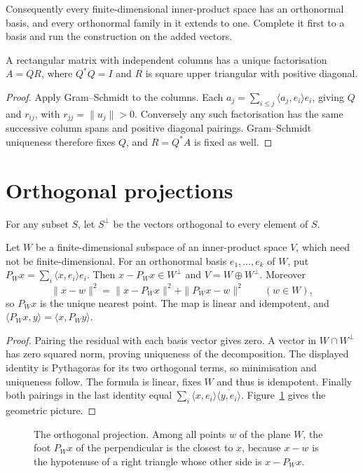 Consequently every finite-dimensional inner-product space has an orthonormal basis, and every orthonormal family in it extends to one. Complete it first to a basis and run the construction on the added vectors.

\begin{corollary}[$QR$ factorisation]\label{linear:cor:qr}
A rectangular matrix with independent columns has a unique factorisation $A=QR$, where $Q^*Q=I$ and $R$ is square upper triangular with positive diagonal.
\end{corollary}
\begin{proof}
Apply Gram--Schmidt to the columns. Each $a_j=\sum_{i\le j}\langle a_j,e_i\rangle e_i$, giving $Q$ and $r_{ij}$, with $r_{jj}=\|u_j\|>0$. Conversely any such factorisation has the same successive column spans and positive diagonal pairings. Gram--Schmidt uniqueness therefore fixes $Q$, and $R=Q^*A$ is fixed as well.
\end{proof}

\section{Orthogonal projections}

For any subset $S$, let $S^\perp$ be the vectors orthogonal to every element of $S$.
\begin{theorem}\label{linear:thm:projection}
Let $W$ be a finite-dimensional subspace of an inner-product space $V$, which need not be finite-dimensional. For an orthonormal basis $e_1,\ldots,e_k$ of $W$, put $P_Wx=\sum_i\langle x,e_i\rangle e_i$. Then $x-P_Wx\in W^\perp$ and $V=W\oplus W^\perp$. Moreover
\[\|x-w\|^2=\|x-P_Wx\|^2+\|P_Wx-w\|^2\qquad(w\in W),\]
so $P_Wx$ is the unique nearest point. The map is linear and idempotent, and $\langle P_Wx,y\rangle=\langle x,P_Wy\rangle$.
\end{theorem}
\begin{proof}
Pairing the residual with each basis vector gives zero. A vector in $W\cap W^\perp$ has zero squared norm, proving uniqueness of the decomposition. The displayed identity is Pythagoras for its two orthogonal terms, so minimisation and uniqueness follow. The formula is linear, fixes $W$ and thus is idempotent. Finally both pairings in the last identity equal $\sum_i\langle x,e_i\rangle\overline{\langle y,e_i\rangle}$. Figure~\ref{linear:fig:projection} gives the geometric picture.
\end{proof}
\begin{figure}[ht]
\centering
{}
\caption{The orthogonal projection. Among all points $w$ of the plane $W$, the foot $P_Wx$ of the perpendicular is the
closest to $x$, because $x-w$ is the hypotenuse of a right triangle whose other side is $x-P_Wx$.}
\label{linear:fig:projection}
\end{figure}

